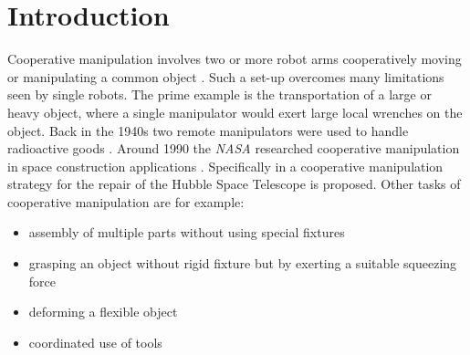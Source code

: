 \documentclass[a4paper,twoside, openright,12pt]{report}
\begin{document}
\chapter{Introduction}

%
Cooperative manipulation involves two or more robot arms cooperatively moving or manipulating a common object \cite{CoopManipHandbook}. Such a set-up overcomes many limitations seen by single robots. The prime example is the transportation of a large or heavy object, where a single manipulator would exert large local wrenches on the object. Back in the 1940s two remote manipulators were used to handle radioactive goods \cite{Goertz_52}. Around 1990 the \emph{NASA} researched cooperative manipulation in space construction applications \cite{Schneider_92}. Specifically in \cite{Lee_05} a cooperative manipulation strategy for the repair of the Hubble Space Telescope is proposed. Other tasks of cooperative manipulation are for example:
\begin{itemize}
\itemsep0em
	\item assembly of multiple parts without using special fixtures
	\item grasping an object without rigid fixture but by exerting a suitable squeezing force
	\item deforming a flexible object
	\item coordinated use of tools
\end{itemize}
\end{document}
